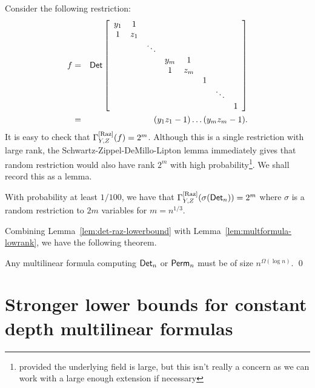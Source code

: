 Consider the following restriction:
\begin{eqnarray*}
f & = & \mathsf{Det} \left[ \begin{array}{cccccccc}
y_1 & 1   &        &     &     &  &        &   \\
1   & z_1 &        &     &     &  &        &   \\
    &     & \ddots &     &     &  &        &   \\
    &     &        & y_m &1    &  &        &   \\
    &     &        & 1   &z_m  &  &        &   \\
    &     &        &     &     & 1&        &   \\
    &     &        &     &     &  & \ddots &   \\
    &     &        &     &     &  &        & 1
  \end{array}\right]\\
 &= & (y_1z_1 - 1)\dots (y_mz_m - 1).
\end{eqnarray*}
It is easy to check that $\Gamma^{\mathrm{[Raz]}}_{Y,Z}(f) = 2^m$. Although this is a single restriction with large rank, the Schwartz-Zippel-DeMillo-Lipton lemma immediately gives that random restriction would also have rank $2^m$ with high probability\footnote{provided the underlying field is large, but this isn't really a concern as we can work with a large enough extension if necessary}. We shall record this as a lemma. 

\begin{lemma}\label{lem:det-raz-lowerbound}
With probability at least $1/100$, we have that $\Gamma^{\mathrm{[Raz]}}_{Y,Z}(\sigma(\mathsf{Det}_n)) = 2^m$ where $\sigma$ is a random restriction to $2m$ variables for $m = n^{1/3}$. 
\end{lemma}


Combining Lemma~\ref{lem:det-raz-lowerbound} with Lemma~\ref{lem:multformula-lowrank}, we have the following theorem. 

\begin{theorem} Any multilinear formula computing $\mathsf{Det}_n$ or $\mathsf{Perm}_n$ must be of size $n^{\Omega(\log n)}$. \qed
\end{theorem}


\section{Stronger lower bounds for constant depth multilinear formulas}

